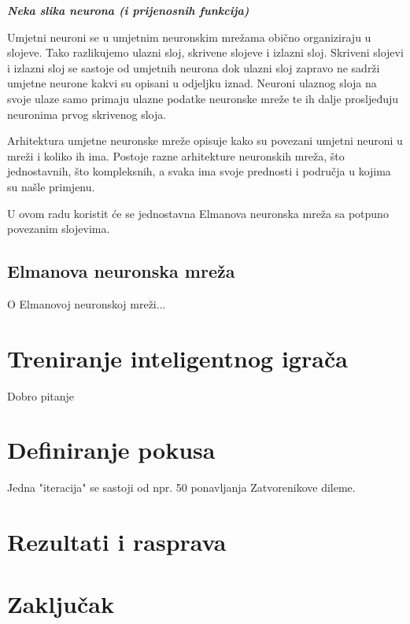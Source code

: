 \documentclass[zavrsnirad]{fer}
\begin{document}
	\textit{\textbf{Neka slika neurona (i prijenosnih funkcija)}}
	
	Umjetni neuroni se u umjetnim neuronskim mrežama obično organiziraju u slojeve. Tako razlikujemo ulazni sloj, skrivene slojeve i izlazni sloj. Skriveni slojevi i izlazni sloj se sastoje od umjetnih neurona dok ulazni sloj zapravo ne sadrži umjetne neurone kakvi su opisani u odjeljku iznad. Neuroni ulaznog sloja na svoje ulaze samo primaju ulazne podatke neuronske mreže te ih dalje prosljeđuju neuronima prvog skrivenog sloja.
	
	Arhitektura umjetne neuronske mreže opisuje kako su povezani umjetni neuroni u mreži i koliko ih ima. Postoje razne arhitekture neuronskih mreža, što jednostavnih, što kompleksnih, a svaka ima svoje prednosti i područja u kojima su našle primjenu.
	
	U ovom radu koristit će se jednostavna Elmanova neuronska mreža sa potpuno povezanim slojevima.
	
	\section{Elmanova neuronska mreža}
	
		O Elmanovoj neuronskoj mreži...
	
\chapter{Treniranje inteligentnog igrača}

	Dobro pitanje

\chapter{Definiranje pokusa}

	Jedna "iteracija" se sastoji od npr. 50 ponavljanja Zatvorenikove dileme.






\chapter{Rezultati i rasprava}
\label{pog:rezultati_i_rasprava}



\chapter{Zaključak}
\label{pog:zakljucak}
\end{document}

